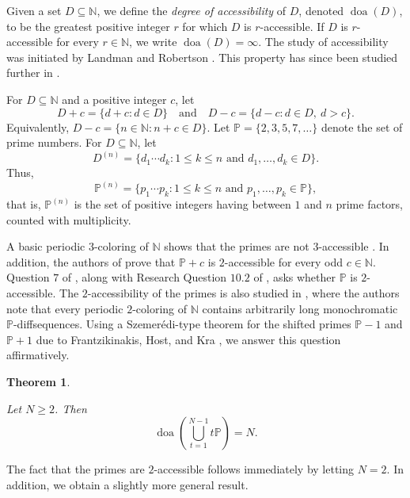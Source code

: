 \documentclass[10pt,a4paper]{amsart}
\newtheorem{theorem}{Theorem}
\newcommand{\N}{\mathbb{N}}
\begin{document}
Given a set $D \subseteq \N$, we define the \textit{degree of accessibility} of $D$, denoted $\operatorname{doa}(D)$, to be the greatest positive integer $r$ for which $D$ is $r$-accessible. If $D$ is $r$-accessible for every $r \in \N$, we write $\operatorname{doa}(D)=\infty$. The study of accessibility was initiated by Landman and Robertson \cite{landman2007avoiding}. This property has since been studied further in \cite{ardal2008ramsey,clifton2024new,farhangi2021distance,jungic2005conjecture,landman2014ramsey,landmanramsey,landman2010avoiding,oscar2025,wesley2022improved}.

For $D \subseteq \mathbb{N}$ and a positive integer $c$, let $$ D+c=\{d+c : d\in D\} \quad \text{and} \quad D-c=\{d-c : d \in D,\ d>c\}. $$ Equivalently, $D-c=\{n \in \mathbb{N} :n+c \in D\}$. Let $\mathbb{P}=\{2,3,5,7,\dots\}$ denote the set of prime numbers. For $D \subseteq \mathbb{N}$, let $$D^{(n)}=\{d_1\cdots d_k : 1 \leq k \leq n \text{ and } d_1,\dots,d_k \in D\}.$$ Thus, $$ \mathbb{P}^{(n)} = \{p_1 \cdots p_k : 1 \leq k \leq n \text{ and } p_1,\dots,p_k \in \mathbb{P}\}, $$ that is, $\mathbb{P}^{(n)}$ is the set of positive integers having between $1$ and $n$ prime factors, counted with multiplicity. 


A basic periodic $3$-coloring of $\mathbb{N}$ shows that the primes are not $3$-accessible \cite{landman2007avoiding}. In addition, the authors of \cite{landman2007avoiding} prove that $\mathbb{P}+c$ is $2$-accessible for every odd $c \in \mathbb{N}$. Question $7$ of \cite{landman2007avoiding}, along with Research Question $10.2$ of \cite{landman2014ramsey}, asks whether $\mathbb{P}$ is $2$-accessible. The $2$-accessibility of the primes is also studied in \cite{landman2010avoiding}, where the authors note that every periodic $2$-coloring of $\mathbb{N}$ contains arbitrarily long monochromatic $\mathbb{P}$-diffsequences. Using a Szemerédi-type theorem for the shifted primes $\mathbb{P}-1$ and $\mathbb{P}+1$ due to Frantzikinakis, Host, and Kra \cite{frantzikinakis2013polynomial}, we answer this question affirmatively.



\begin{theorem} \label{thm:D}

Let $N \geq 2$. Then $$\operatorname{doa}\left(\bigcup_{t=1}^{N-1}t\mathbb{P}\right)=N.$$

\end{theorem}


The fact that the primes are $2$-accessible follows immediately by letting $N=2$. In addition, we obtain a slightly more general result.
\end{document}
